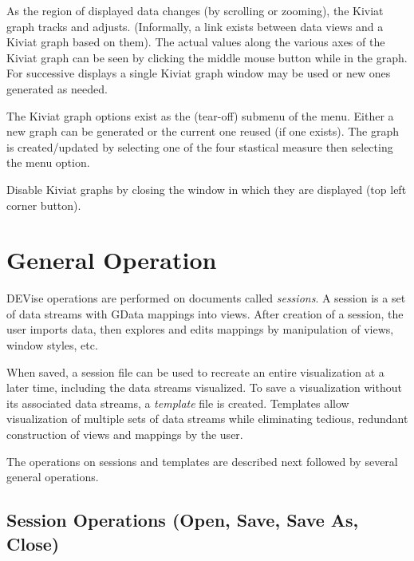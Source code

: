 As the region of displayed data changes (by scrolling or zooming), the Kiviat
graph tracks and adjusts. (Informally, a link exists between data views and a
Kiviat graph based on them). The actual values along the various axes of the
Kiviat graph can be seen by clicking the middle mouse button while in the
graph. For successive displays a single Kiviat graph window may be used or new
ones generated as needed.

The Kiviat graph options exist as the (tear-off)  submenu of
the  menu. Either a new graph can be generated or the current one
reused (if one exists). The graph is created/updated by selecting one of the
four stastical measure then selecting the  menu option.

Disable Kiviat graphs by closing the window in which they are displayed (top
left corner button).


\section{General Operation}

DEVise operations are performed on documents called {\em sessions}. A session is
a set of data streams with GData mappings into views. After creation of a
session, the user imports data, then explores and edits mappings by manipulation
of views, window styles, etc.

When saved, a session file can be used to recreate an entire visualization at a
later time, including the data streams visualized. To save a visualization
without its associated data streams, a {\em template} file is created. Templates
allow visualization of multiple sets of data streams while eliminating tedious,
redundant construction of views and mappings by the user.

The operations on sessions and templates are described next followed by several
general operations.


\subsection{Session Operations (Open, Save, Save As, Close)}


